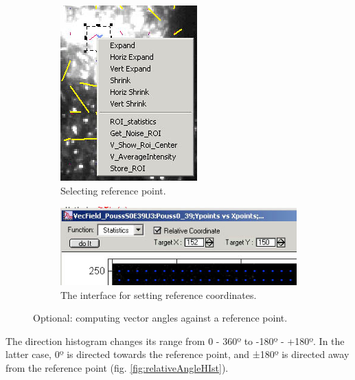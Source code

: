 \documentclass{article}
\begin{document}
\begin{figure}[!ht]
\begin{subfigure}{.3\textwidth}
  \centering
  \includegraphics[width=.8\linewidth]{img/image038.jpg}
  \caption{Selecting reference point.}
  \label{fig:setRefPoint}
\end{subfigure}%
\begin{subfigure}{.7\textwidth}
  \centering
  \includegraphics[width=.8\linewidth]{img/image040.jpg}
  \caption{The interface for setting reference coordinates.}
  \label{fig:targetXY}
\end{subfigure}
\caption{Optional: computing vector angles against a reference point.}
\label{fig:referenceSettings}
\end{figure}

The direction histogram changes its range from 0 - 360º to -180º -
+180º. In the latter case, 0º is directed towards the reference point,
and ±180º is directed away from the reference point (fig. \ref{fig:relativeAngleHIst}).
\end{document}
